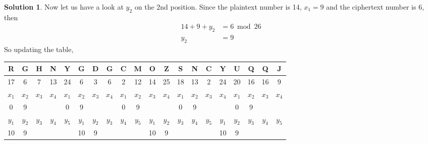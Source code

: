 \documentclass[11pt]{article}
\theoremstyle{definition}\newtheorem{definition}{Definition}
\theoremstyle{definition}\newtheorem{question}{Question}
\theoremstyle{definition}\newtheorem*{solution}{Solution}
\begin{document}
\begin{solution}
        Now let us have a look at $y_2$ on the 2nd position. Since the plaintext number is 14, $x_1 = 9$ and the ciphertext number is 6, then
        \begin{align*}
            14 + 9 + y_2 &= 6 \bmod {26}\\
            y_2 &= 9
        \end{align*}
        So updating the table,
        \begin{center}
            \begin{tabular}{|cccccccccccccccccccc|}
                \hline
                R     & G     & H     & N                          & \multicolumn{1}{c|}{Y}     & G     & D     & G                          & C     & \multicolumn{1}{c|}{M}     & O     & Z                          & S     & N     & \multicolumn{1}{c|}{C}     & Y                          & U     & Q     & Q     & J     \\ \hline
                17    & 6     & 7     & 13                         & 24                         & 6     & 3     & 6                          & 2     & 12                         & 14    & 25                         & 18    & 13    & 2                          & 24                         & 20    & 16    & 16    & 9     \\ \hline
                $x_1$ & $x_2$ & $x_3$ & \multicolumn{1}{c|}{$x_4$} & $x_1$                      & $x_2$ & $x_3$ & \multicolumn{1}{c|}{$x_4$} & $x_1$ & $x_2$                      & $x_3$ & \multicolumn{1}{c|}{$x_4$} & $x_1$ & $x_2$ & $x_3$                      & \multicolumn{1}{c|}{$x_4$} & $x_1$ & $x_2$ & $x_3$ & $x_4$ \\ \hline
                0     & 9     &       & \multicolumn{1}{c|}{}      & 0                          & 9     &       & \multicolumn{1}{c|}{}      & 0     & 9                          &       & \multicolumn{1}{c|}{}      & 0     & 9     &                            & \multicolumn{1}{c|}{}      & 0     & 9     &       &       \\ \hline
                $y_1$ & $y_2$ & $y_3$ & $y_4$                      & \multicolumn{1}{c|}{$y_5$} & $y_1$ & $y_2$ & $y_3$                      & $y_4$ & \multicolumn{1}{c|}{$y_5$} & $y_1$ & $y_2$                      & $y_3$ & $y_4$ & \multicolumn{1}{c|}{$y_5$} & $y_1$                      & $y_2$ & $y_3$ & $y_4$ & $y_5$ \\ \hline
                10    & 9     &       &                            & \multicolumn{1}{c|}{}      & 10    & 9     &                            &       & \multicolumn{1}{c|}{}      & 10    & 9                          &       &       & \multicolumn{1}{c|}{}      & 10                         & 9     &       &       &       \\ \hline

\end{tabular}
\end{center}
\end{solution}
\end{document}
